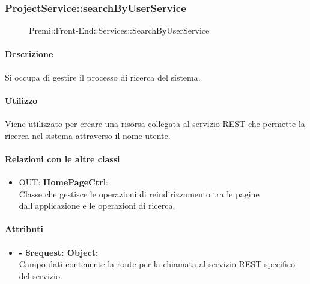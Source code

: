 		
		\subsubsection{ProjectService::searchByUserService}
		\begin{figure}[h]
			\centering
			\caption[Premi::Front-End::Services::SearchByUserService]{Premi::Front-End::Services::SearchByUserService}
		\end{figure}
		
		\paragraph{Descrizione}
		Si occupa di gestire il processo di ricerca del sistema.
		
		\paragraph{Utilizzo}
		Viene utilizzato per creare una risorsa collegata al servizio REST che permette la ricerca nel sistema attraverso il nome utente.
		
		\paragraph{Relazioni con le altre classi}
		\begin{itemize}
			\item OUT: \textbf{HomePageCtrl}:\\
			Classe che gestisce le operazioni di reindirizzamento tra le pagine dall'applicazione e le operazioni di ricerca.
		\end{itemize}
		
		\paragraph{Attributi}
		\begin{itemize}
			\item \textbf{- \$request: Object}:\\
			Campo dati contenente la route per la chiamata al servizio REST specifico del servizio.
		\end{itemize}	
		
